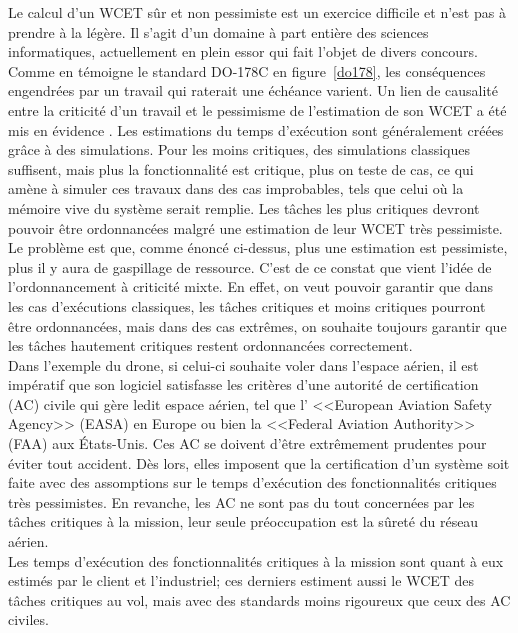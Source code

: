 \documentclass[11pt,a4paper,oneside]{book}
\theoremstyle{break}
\theoremstyle{breakplain}
\begin{document}
Le calcul d'un WCET sûr et non pessimiste est un exercice difficile et n'est pas à prendre à la légère. Il s'agit d'un domaine à part entière des sciences informatiques, actuellement en plein essor qui fait l'objet de divers concours.\\

Comme en témoigne le standard DO-178C en figure~\ref{do178}, les conséquences engendrées par un travail qui raterait une échéance varient. Un lien de causalité entre la criticité d'un travail et le pessimisme de l'estimation de son WCET a été mis en évidence \cite{vestal2007preemptive}. Les estimations du temps d'exécution sont généralement créées grâce à des simulations. Pour les moins critiques, des simulations classiques suffisent, mais plus la fonctionnalité est critique, plus on teste de cas, ce qui amène à simuler ces travaux dans des cas improbables, tels que celui où la mémoire vive du système serait remplie. Les tâches les plus critiques devront pouvoir être ordonnancées malgré une estimation de leur WCET très pessimiste. Le problème est que, comme énoncé ci-dessus, plus une estimation est pessimiste, plus il y aura de gaspillage de ressource. C'est de ce constat que vient l'idée de l'ordonnancement à criticité mixte. En effet, on veut pouvoir garantir que dans les cas d'exécutions classiques, les tâches critiques et moins critiques pourront être ordonnancées, mais dans des cas extrêmes, on souhaite toujours garantir que les tâches hautement critiques restent ordonnancées correctement.\\

Dans l'exemple du drone, si celui-ci souhaite voler dans l'espace aérien, il est impératif que son logiciel satisfasse les critères d'une autorité de certification (AC) civile qui gère ledit espace aérien, tel que l’ <<European Aviation Safety Agency>> (EASA) en Europe ou bien la <<Federal Aviation Authority>> (FAA) aux États-Unis. Ces AC se doivent d'être extrêmement prudentes pour éviter tout accident. Dès lors, elles imposent que la certification d'un système soit faite avec des assomptions sur le temps d'exécution des fonctionnalités critiques très pessimistes. En revanche, les AC ne sont pas du tout concernées par les tâches critiques à la mission, leur seule préoccupation est la sûreté du réseau aérien.\\
Les temps d'exécution des fonctionnalités critiques à la mission sont quant à eux estimés par le client et l'industriel; ces derniers estiment aussi le WCET des tâches critiques au vol, mais avec des standards moins rigoureux que ceux des AC civiles.\\
\end{document}

